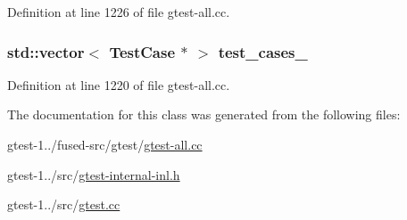 \-Definition at line 1226 of file gtest-\/all.\-cc.

\hypertarget{classtesting_1_1internal_1_1UnitTestImpl_ab62e4e13580e882140f8bf78a94ce669}{
\subsubsection[{test\-\_\-cases\-\_\-}]{\setlength{\rightskip}{0pt plus 5cm}std\-::vector$<$ {\bf \-Test\-Case} $\ast$ $>$ {\bf test\-\_\-cases\-\_\-}}}\label{d0/de3/classtesting_1_1internal_1_1UnitTestImpl_ab62e4e13580e882140f8bf78a94ce669}


\-Definition at line 1220 of file gtest-\/all.\-cc.



\-The documentation for this class was generated from the following files\-:\begin{DoxyCompactItemize}
\item 
gtest-\/1../fused-\/src/gtest/\hyperlink{fused-src_2gtest_2gtest-all_8cc}{gtest-\/all.\-cc}\item 
gtest-\/1../src/\hyperlink{gtest-internal-inl_8h}{gtest-\/internal-\/inl.\-h}\item 
gtest-\/1../src/\hyperlink{gtest_8cc}{gtest.\-cc}\end{DoxyCompactItemize}
